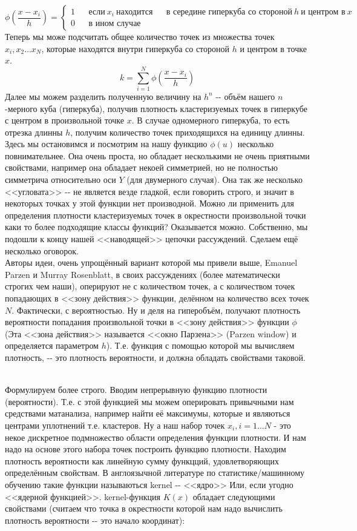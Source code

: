 \documentclass[11pt]{article}
\begin{document}
    \[
\phi\left(\frac{x - x_i}{h}\right) = \left\lbrace
            \begin{aligned}
            1 && \mbox{если} \: x_i \: \mbox{находится} && \mbox{в середине гиперкуба со стороной}\: h \: \mbox{и центром в} \: x \\
            0 && \mbox{в ином случае} &&
           \end{aligned}
          \right.
\] Теперь мы може подсчитать общее количество точек из множества точек
$x_i, x_2 \ldots x_N$, которые находятся внутри гиперкуба со стороной
$h$ и центром в точке $x$. \[
k = \sum\limits_{i = 1}^{N}\phi\left(\frac{x - x_i}{h}\right)
\] Далее мы можем разделить полученную величину на $h^n$ -\/- объём
нашего $n$-мерного куба (гиперкуба), получив плотность кластеризуемых
точек в гиперкубе с центром в произвольной точке $x$. В случае
одномерного гиперкуба, то есть отрезка длинны $h$, получим количество
точек приходящихся на единицу длинны. \\ Здесь мы
остановимся и посмотрим на нашу функцию $\phi(u)$ несколько
повнимательнее. Она очень проста, но обладает несколькими не очень
приятными свойствами, например она обладает некоей симметрией, но не
полностью симметрича относительно оси $Y$ (для двумерного случая). Она
так же несколько <<угловата>> -\/- не является везде гладкой, если
говорить строго, и значит в некоторых точках у этой функции нет
производной. Можно ли применить для определения плотности кластеризуемых
точек в окрестности произвольной точки каки то более подходящие классы
функций? Оказывается можно. Собственно, мы подошли к концу нашей
<<наводящей>> цепочки рассуждений. Сделаем ещё несколько оговорок.
\\  Авторы идеи, очень упрощённый вариант которой мы
привели выше, Emanuel Parzen и Murray Rosenblatt, в своих рассуждениях
(более математически строгих чем наши), оперируют не с количеством
точек, а с количеством точек попадающих в <<зону действия>>
функции, делённом на количество всех точек $N$. Фактически, с
вероятностью. Ну и деля на гиперобъём, получают плотность вероятности
попадания произвольной точки в <<зону действия>> функции $\phi$
(Эта <<зона действия>> называется <<окно Парзена>> (Parzen
window) \cite{litlink0} и определяется параметром $h$). Т.е. функция с
помощью которой мы вычисляем плотность, -\/- это плотность вероятности,
и должна обладать свойствами таковой.

    \\ Формулируем более строго. Вводим непрерывную функцию
плотности (вероятности). Т.е. с этой функцией мы можем оперировать
привычными нам средствами матанализа, например найти её максимумы,
которые и являються центрами уплотнений т.е. кластеров. Ну а наш набор
точек $x_i, i = 1 \ldots N$ - это некое дискретное подмножество области
определения функции плотности. И нам надо на основе этого набора точек
построить функцию плотности. Находим плотность вероятности как линейную
сумму функцций, удовлетворяющих определённым свойствам. В англоязычной
литературе по статистике/машинному обучению такие функции называються
kernel -\/- <<ядро>> Или, если угодно <<ядерной функцией>>.
kernel-функция $K(x)$ обладает следующими свойствами (считаем что точка
в окрестности которой нам надо вычислить плотность вероятности -\/- это
начало координат):
\end{document}
